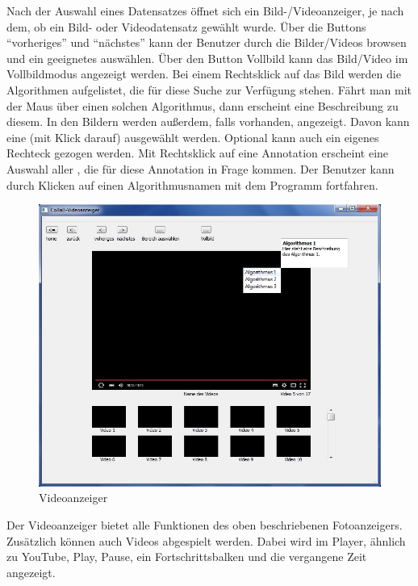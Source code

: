 Nach der Auswahl eines Datensatzes öffnet sich ein Bild-/Videoanzeiger, je nach dem, ob ein Bild- oder Videodatensatz gewählt wurde. Über die Buttons \enquote{vorheriges} und \enquote{nächstes} kann der Benutzer durch die Bilder/Videos browsen und ein geeignetes auswählen. Über den Button Vollbild kann das Bild/Video im Vollbildmodus angezeigt werden.
Bei einem Rechtsklick auf das Bild werden die Algorithmen aufgelistet, die für diese Suche zur Verfügung stehen. Fährt man mit der Maus über einen solchen Algorithmus, dann erscheint eine Beschreibung zu diesem.
In den Bildern werden außerdem, falls vorhanden,  angezeigt. Davon kann eine (mit Klick darauf) ausgewählt werden. Optional kann auch ein eigenes Rechteck gezogen werden. Mit Rechtsklick auf eine \gls{Annotation} erscheint eine Auswahl aller , die für diese \gls{Annotation} in Frage kommen. Der Benutzer kann durch Klicken auf einen Algorithmusnamen mit dem Programm fortfahren.

\begin{figure}[H]
\includegraphics[width=1\linewidth]{img/Videoanzeiger}
\caption{Videoanzeiger}
\label{fig:videoanzeiger}
\end{figure}
Der Videoanzeiger bietet alle Funktionen des oben beschriebenen Fotoanzeigers. Zusätzlich können auch Videos abgespielt werden. Dabei wird im Player, ähnlich zu YouTube, Play, Pause, ein Fortschrittsbalken und die vergangene Zeit angezeigt. 

